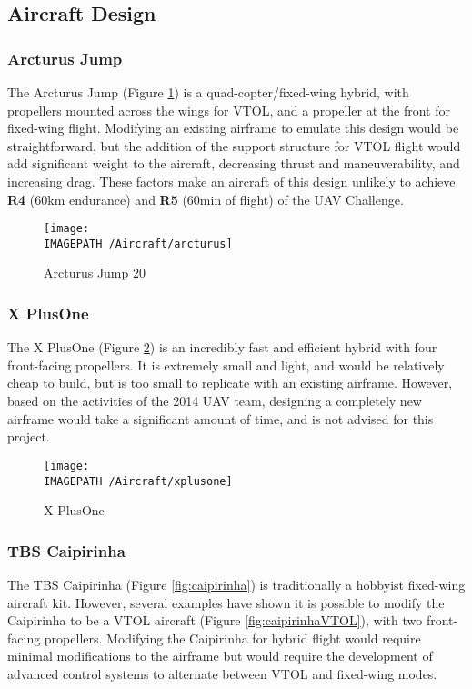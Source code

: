\subsection{Aircraft Design}
\subsubsection*{Arcturus Jump}
The Arcturus Jump\cite{ref:arcturus} (Figure \ref{fig:arcturus}) is a quad-copter/fixed-wing hybrid, with propellers mounted across the wings for VTOL, and a propeller at the front for fixed-wing flight. Modifying an existing airframe to emulate this design would be straightforward, but the addition of the support structure for VTOL flight would add significant weight to the aircraft, decreasing thrust and maneuverability, and increasing drag. These factors make an aircraft of this design unlikely to achieve \textbf{R4} (60km endurance) and \textbf{R5} (60min of flight) of the UAV Challenge.

\begin{figure}[!h]
	\centering
	\texttt{[image: \\IMAGEPATH /Aircraft/arcturus]}
	\caption{Arcturus Jump 20}
	\label{fig:arcturus}
\end{figure}

\subsubsection*{X PlusOne}
The X PlusOne\cite{ref:xplusone} (Figure \ref{fig:xplusone}) is an incredibly fast and efficient hybrid with four front-facing propellers. It is extremely small and light, and would be relatively cheap to build, but is too small to replicate with an existing airframe. However, based on the activities of the 2014 UAV team, designing a completely new airframe would take a significant amount of time, and is not advised for this project.

\begin{figure}[!ht]
	\centering
	\texttt{[image: \\IMAGEPATH /Aircraft/xplusone]}
	\caption{X PlusOne}
	\label{fig:xplusone}
\end{figure}

\subsubsection*{TBS Caipirinha}
The TBS Caipirinha\cite{ref:caipirinha} (Figure \ref{fig:caipirinha}) is traditionally a hobbyist fixed-wing aircraft kit. However, several examples have shown it is possible to modify the Caipirinha to be a VTOL aircraft\cite{ref:caipirinhaVTOL} (Figure \ref{fig:caipirinhaVTOL}), with two front-facing propellers. Modifying the Caipirinha for hybrid flight would require minimal modifications to the airframe but would require the development of advanced control systems to alternate between VTOL and fixed-wing modes.

